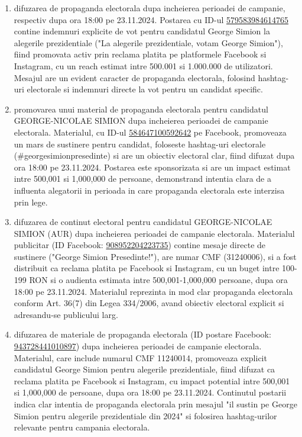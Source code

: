 \documentclass[a4paper,12pt]{article}
\begin{document}
\begin{enumerate}[leftmargin=*, label=\arabic*.)]
    \item difuzarea de propaganda electorala dupa incheierea perioadei de campanie, respectiv dupa ora 18:00 pe 23.11.2024. Postarea cu ID-ul \href{https://www.facebook.com/ads/library/?id=579583984614765}{579583984614765} contine indemnuri explicite de vot pentru candidatul George Simion la alegerile prezidentiale ("La alegerile prezidentiale, votam George Simion"), fiind promovata activ prin reclama platita pe platformele Facebook si Instagram, cu un reach estimat intre 500.001 si 1.000.000 de utilizatori. Mesajul are un evident caracter de propaganda electorala, folosind hashtag-uri electorale si indemnuri directe la vot pentru un candidat specific.
    \item promovarea unui material de propaganda electorala pentru candidatul GEORGE-NICOLAE SIMION dupa incheierea perioadei de campanie electorala. Materialul, cu ID-ul \href{https://www.facebook.com/ads/library/?id=584647100592642}{584647100592642} pe Facebook, promoveaza un mars de sustinere pentru candidat, foloseste hashtag-uri electorale (\#georgesimionpresedinte) si are un obiectiv electoral clar, fiind difuzat dupa ora 18:00 pe 23.11.2024. Postarea este sponsorizata si are un impact estimat intre 500,001 si 1,000,000 de persoane, demonstrand intentia clara de a influenta alegatorii in perioada in care propaganda electorala este interzisa prin lege.
    \item difuzarea de continut electoral pentru candidatul GEORGE-NICOLAE SIMION (AUR) dupa incheierea perioadei de campanie electorala. Materialul publicitar (ID Facebook: \href{https://www.facebook.com/ads/library/?id=908952204223735}{908952204223735}) contine mesaje directe de sustinere ("George Simion Presedinte!"), are numar CMF (31240006), si a fost distribuit ca reclama platita pe Facebook si Instagram, cu un buget intre 100-199 RON si o audienta estimata intre 500,001-1,000,000 persoane, dupa ora 18:00 pe 23.11.2024. Materialul reprezinta in mod clar propaganda electorala conform Art. 36(7) din Legea 334/2006, avand obiectiv electoral explicit si adresandu-se publicului larg.
    \item difuzarea de materiale de propaganda electorala (ID postare Facebook: \href{https://www.facebook.com/ads/library/?id=943728441010897}{943728441010897}) dupa incheierea perioadei de campanie electorala. Materialul, care include numarul CMF 11240014, promoveaza explicit candidatul George Simion pentru alegerile prezidentiale, fiind difuzat ca reclama platita pe Facebook si Instagram, cu impact potential intre 500,001 si 1,000,000 de persoane, dupa ora 18:00 pe 23.11.2024. Continutul postarii indica clar intentia de propaganda electorala prin mesajul "il sustin pe George Simion pentru alegerile prezidentiale din 2024" si folosirea hashtag-urilor relevante pentru campania electorala.
\end{enumerate}
\end{document}
